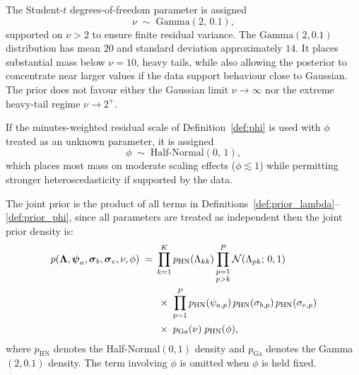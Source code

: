 \begin{definition}
\label{def:prior_nu}
The Student-$t$ degrees-of-freedom parameter is assigned
\begin{equation}
\nu \;\sim\; \mathrm{Gamma}(2,\, 0.1),
\label{eq:prior_nu}
\end{equation}
supported on $\nu > 2$ to ensure finite residual variance. The $\mathrm{Gamma}(2, 0.1)$ distribution has mean $20$ and standard deviation approximately $14$. It places substantial mass below $\nu = 10$, heavy tails, while also allowing the posterior to concentrate near larger values if the data support behaviour close to Gaussian. The prior does not favour either the Gaussian limit $\nu \to \infty$ nor the extreme heavy-tail regime $\nu \to 2^+$\cite{juarez2010model}.
\end{definition}

\begin{definition}
\label{def:prior_phi}
If the minutes-weighted residual scale of Definition~\ref{def:phi} is used with $\phi$ treated as an unknown parameter, it is assigned
\begin{equation}
\phi \;\sim\; \mathrm{Half\text{-}Normal}(0,\, 1),
\label{eq:prior_phi}
\end{equation}
which places most mass on moderate scaling effects ($\phi \lesssim 1$) while permitting stronger heteroscedasticity if supported by the data.
\end{definition}

The joint prior is the product of all terms in Definitions~\ref{def:prior_lambda}--\ref{def:prior_phi}, since all parameters are treated as independent then the joint prior density is:
\begin{align}
p\!\left(\boldsymbol{\Lambda}, \boldsymbol{\psi}_a, \boldsymbol{\sigma}_b, \boldsymbol{\sigma}_e, \nu, \phi\right)
\;=\;
&\prod_{k=1}^{K} p_{\mathrm{HN}}(\Lambda_{kk})
\prod_{\substack{p=1\\p>k}}^{P} \mathcal{N}(\Lambda_{pk};\, 0, 1) \notag \\
&\;\times\;
\prod_{p=1}^{P} p_{\mathrm{HN}}(\psi_{a,p})\,p_{\mathrm{HN}}(\sigma_{b,p})\,p_{\mathrm{HN}}(\sigma_{e,p}) \notag \\
&\;\times\;
p_{\mathrm{Ga}}(\nu)\;p_{\mathrm{HN}}(\phi),
\label{eq:joint_prior}
\end{align}
where $p_{\mathrm{HN}}$ denotes the Half-Normal$(0,1)$ density and $p_{\mathrm{Ga}}$ denotes the Gamma$(2,0.1)$ density. The term involving $\phi$ is omitted when $\phi$ is held fixed.

